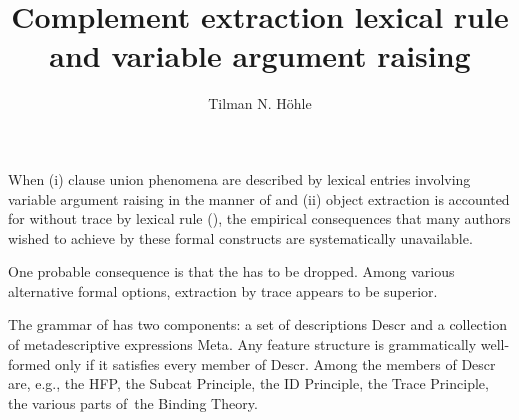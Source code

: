 \documentclass[output=paper]{LSP/langsci}
\author{Tilman N. Höhle}
\title{Complement extraction lexical rule and variable argument raising}
\begin{document}
\label{chap-celr}
%
%
\setcounter{randcount}{0}%
%
\randnum\label{rn:14-1}%
When (i) clause union phenomena are described by lexical entries
involving variable argument raising in the manner of \citet{HinrichsNakazawa1993b} and (ii) object extraction is accounted for without
trace by lexical rule (), the empirical consequences that many
authors wished to achieve by these formal constructs are
systematically unavailable.

\renewcommand*{\thefootnote}{\fnsymbol{footnote}}
\setcounter{footnote}{4}


\renewcommand*{\thefootnote}{\arabic{footnote}}
\setcounter{footnote}{0}

\randnum\label{rn:14-2}One probable consequence is that the  has to be dropped. Among
various alternative formal options, extraction by trace appears to
be superior.

\randnum\label{rn:14-3}The grammar of \citet{PollardSagE1994} has two components: a set
of descriptions \textsf{Descr} and a collection of metadescriptive expressions
\textsf{Meta}. Any feature structure is grammatically well-formed only if it
satisfies every member of \textsf{Descr}. Among the members of \textsf{Descr} are,
e.g., the HFP, the Subcat Principle, the ID Principle, the Trace
Principle, the various parts of~the Binding Theory.
\end{document}
